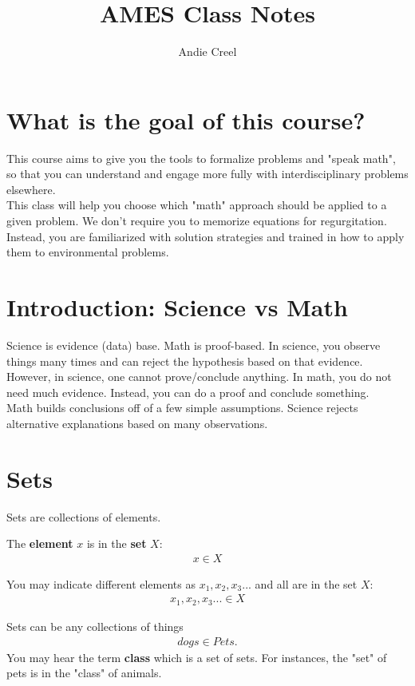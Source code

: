 \documentclass[12pt]{article}
\title{AMES Class Notes }
\author{Andie Creel}
\begin{document}
\maketitle
\section{What is the goal of this course?}
This course aims to give you the tools to formalize problems and "speak math", so that you can understand and engage more fully with interdisciplinary problems elsewhere. \\

This class will help you choose which "math" approach should be applied to a given problem. We don't require you to memorize equations for regurgitation. Instead, you are familiarized with solution strategies and trained in how to apply them to environmental problems. \\

\section{Introduction: Science vs Math}
Science is evidence (data) base. Math is proof-based. In science, you observe things many times and can reject the hypothesis based on that evidence. However, in science, one cannot prove/conclude anything. In math, you do not need much evidence. Instead, you can do a proof and conclude something. \\

Math builds conclusions off of a few simple assumptions. Science rejects alternative explanations based on many observations.  

\section{Sets}
Sets are collections of elements.  

The \textbf{element} $x$ is in the \textbf{set} $X$:
\begin{align*}
    x \in X
\end{align*}

You may indicate different elements as $x_1, x_2, x_3...$ and all are in the set $X$:
\begin{align*}
    x_1, x_2, x_3... \in X
\end{align*}

Sets can be any collections of things 
\begin{align*}
    dogs \in Pets.
\end{align*}
You may hear the term \textbf{class} which is a set of sets. For instances, the "set" of pets is in the "class" of animals. \\
\end{document}
